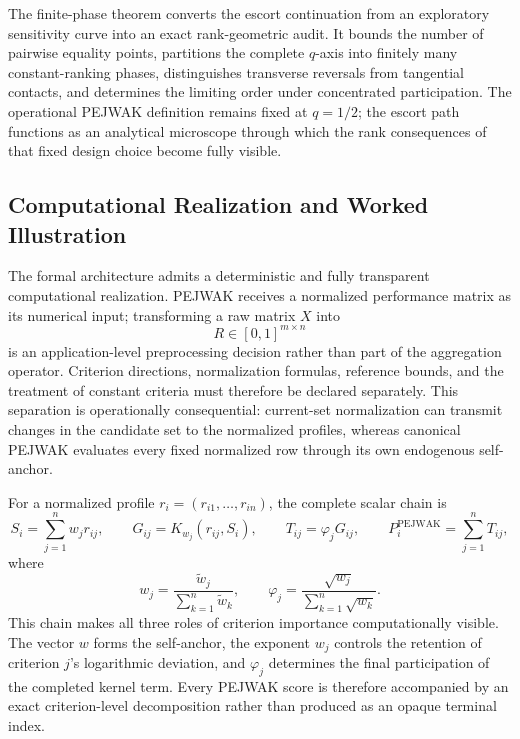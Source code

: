 \documentclass[reqno,11pt]{amsart}
\theoremstyle{definition}
\theoremstyle{plain}
\theoremstyle{remark}
\begin{document}
The finite-phase theorem converts the escort continuation from an
exploratory sensitivity curve into an exact rank-geometric audit. It
bounds the number of pairwise equality points, partitions the complete
\(q\)-axis into finitely many constant-ranking phases, distinguishes
transverse reversals from tangential contacts, and determines the
limiting order under concentrated participation. The operational PEJWAK
definition remains fixed at \(q=1/2\); the escort path functions as an
analytical microscope through which the rank consequences of that fixed
design choice become fully visible.
\subsection{Computational Realization and Worked Illustration}
\label{subsec:computational-realization}

The formal architecture admits a deterministic and fully transparent
computational realization. PEJWAK receives a normalized performance
matrix as its numerical input; transforming a raw matrix \(X\) into
\[
R\in[0,1]^{m\times n}
\]
is an application-level preprocessing decision rather than part of the
aggregation operator. Criterion directions, normalization formulas,
reference bounds, and the treatment of constant criteria must therefore
be declared separately. This separation is operationally consequential:
current-set normalization can transmit changes in the candidate set to
the normalized profiles, whereas canonical PEJWAK evaluates every fixed
normalized row through its own endogenous self-anchor.

For a normalized profile
\(r_i=(r_{i1},\ldots,r_{in})\), the complete scalar chain is
\begin{equation}
S_i=\sum_{j=1}^{n}w_jr_{ij},
\qquad
G_{ij}=K_{w_j}(r_{ij},S_i),
\qquad
T_{ij}=\varphi_jG_{ij},
\qquad
P_i^{\mathrm{PEJWAK}}=\sum_{j=1}^{n}T_{ij},
\label{eq:scalar-computational-chain}
\end{equation}
where
\[
w_j=
\frac{\widetilde w_j}{\sum_{k=1}^{n}\widetilde w_k},
\qquad
\varphi_j=
\frac{\sqrt{w_j}}{\sum_{k=1}^{n}\sqrt{w_k}}.
\]
This chain makes all three roles of criterion importance computationally
visible. The vector \(w\) forms the self-anchor, the exponent \(w_j\)
controls the retention of criterion \(j\)'s logarithmic deviation, and
\(\varphi_j\) determines the final participation of the completed kernel
term. Every PEJWAK score is therefore accompanied by an exact
criterion-level decomposition rather than produced as an opaque terminal
index.
\end{document}
